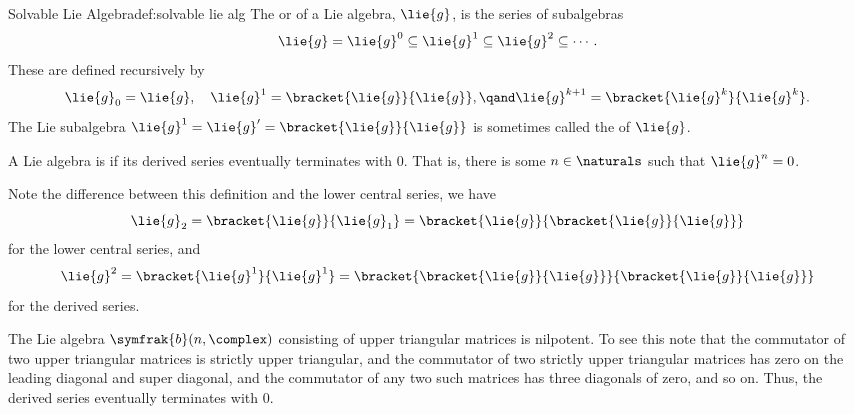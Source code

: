 \documentclass[fleqn]{NotesClass}
\newcommand{\borelLie}{\symfrak{b}}
\begin{document}
    \begin{dfn}{Solvable Lie Algebra}{def:solvable lie alg}
        The  or  of a Lie algebra, \(\lie{g}\), is the series of subalgebras
        \begin{equation}
            \lie{g} = \lie{g}^0 \subseteq \lie{g}^1 \subseteq \lie{g}^2 \subseteq \dotsb.
        \end{equation}
        These are defined recursively by
        \begin{equation}
            \lie{g}_0 = \lie{g}, \quad \lie{g}^1 = \bracket{\lie{g}}{\lie{g}}, \qand \lie{g}^{k+1} = \bracket{\lie{g}^k}{\lie{g}^k}.
        \end{equation}
        The Lie subalgebra \(\lie{g}^1 = \lie{g}' = \bracket{\lie{g}}{\lie{g}}\) is sometimes called the  of \(\lie{g}\).
        
        A Lie algebra is  if its derived series eventually terminates with \(0\).
        That is, there is some \(n \in \naturals\) such that \(\lie{g}^n = 0\).
    \end{dfn}
    
    Note the difference between this definition and the lower central series, we have
    \begin{equation}
        \lie{g}_2 = \bracket{\lie{g}}{\lie{g}_1} = \bracket{\lie{g}}{\bracket{\lie{g}}{\lie{g}}}
    \end{equation}
    for the lower central series, and
    \begin{equation}
        \lie{g}^2 = \bracket{\lie{g}^1}{\lie{g}^1} = \bracket{\bracket{\lie{g}}{\lie{g}}}{\bracket{\lie{g}}{\lie{g}}}
    \end{equation}
    for the derived series.
    
    \begin{exm}{}{}
        The Lie algebra \(\borelLie(n, \complex)\) consisting of upper triangular matrices is nilpotent.
        To see this note that the commutator of two upper triangular matrices is strictly upper triangular, and the commutator of two strictly upper triangular matrices has zero on the leading diagonal and super diagonal, and the commutator of any two such matrices has three diagonals of zero, and so on.
        Thus, the derived series eventually terminates with 0.
    \end{exm}
    
\end{document}
